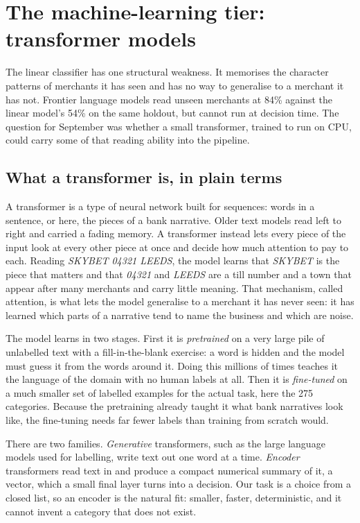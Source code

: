 \section{The machine-learning tier: transformer models}
The linear classifier has one structural weakness. It memorises the character patterns of merchants it has seen and has no way to generalise to a merchant it has not. Frontier language models read unseen merchants at 84\% against the linear model's 54\% on the same holdout, but cannot run at decision time. The question for September was whether a small transformer, trained to run on CPU, could carry some of that reading ability into the pipeline.

\subsection{What a transformer is, in plain terms}
A transformer is a type of neural network built for sequences: words in a sentence, or here, the pieces of a bank narrative. Older text models read left to right and carried a fading memory. A transformer instead lets every piece of the input look at every other piece at once and decide how much attention to pay to each. Reading \emph{SKYBET 04321 LEEDS}, the model learns that \emph{SKYBET} is the piece that matters and that \emph{04321} and \emph{LEEDS} are a till number and a town that appear after many merchants and carry little meaning. That mechanism, called attention, is what lets the model generalise to a merchant it has never seen: it has learned which parts of a narrative tend to name the business and which are noise.

The model learns in two stages. First it is \emph{pretrained} on a very large pile of unlabelled text with a fill-in-the-blank exercise: a word is hidden and the model must guess it from the words around it. Doing this millions of times teaches it the language of the domain with no human labels at all. Then it is \emph{fine-tuned} on a much smaller set of labelled examples for the actual task, here the 275 categories. Because the pretraining already taught it what bank narratives look like, the fine-tuning needs far fewer labels than training from scratch would.

There are two families. \emph{Generative} transformers, such as the large language models used for labelling, write text out one word at a time. \emph{Encoder} transformers read text in and produce a compact numerical summary of it, a vector, which a small final layer turns into a decision. Our task is a choice from a closed list, so an encoder is the natural fit: smaller, faster, deterministic, and it cannot invent a category that does not exist.

